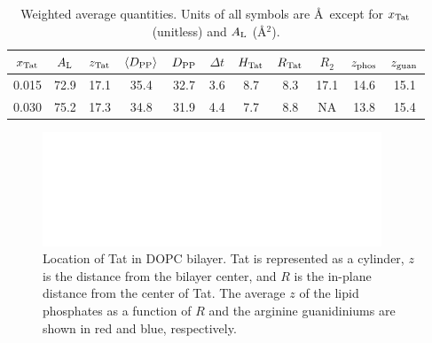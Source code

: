 \begin{table}[htbp]
  \centering
  \begin{tabular}{ccccccccccc}
    \hline
    \rule{0pt}{14pt} %
    $x_\textrm{Tat}$ & $A_\textrm{L}$ & $z_\textrm{Tat}$ & $\langle D_\textrm{PP}\rangle$ & $D_\textrm{PP}$ & $\Delta t$ & $H_\textrm{Tat}$ & $R_\textrm{Tat}$ & $R_2$ & $z_\textrm{phos}$ & $z_\textrm{guan}$ \\
    \hline    
    0.015 & 72.9 & 17.1 & 35.4 & 32.7 & 3.6 & 8.7 & 8.3 & 17.1 & 14.6 & 15.1 \\  
    0.030 & 75.2 & 17.3 & 34.8 & 31.9 & 4.4 & 7.7 & 8.8 & NA & 13.8 & 15.4 \\
    \hline
  \end{tabular}
  \caption[Weighted average quantities]
  {Weighted average quantities.
  Units of all symbols are \AA\ except for $x_\textrm{Tat}$ (unitless)
  and $A_\textrm{L}$ (\AA$^2$).}
  \label{tab:MD_summary}
\end{table}

\begin{figure}[htbp]
  \centering
  \includegraphics[width=0.9\textwidth]{figures/Tat/figure9}
  \caption[Location of Tat in DOPC bilayer]
  {Location of Tat in DOPC bilayer. Tat is represented as a cylinder, $z$ is the distance
  from the bilayer center, and $R$ is the in-plane distance from the center of Tat. The average $z$ of
  the lipid phosphates as a function of $R$ and the arginine guanidiniums are shown in red and blue,
  respectively.}
  \label{fig:figure9}
\end{figure}


